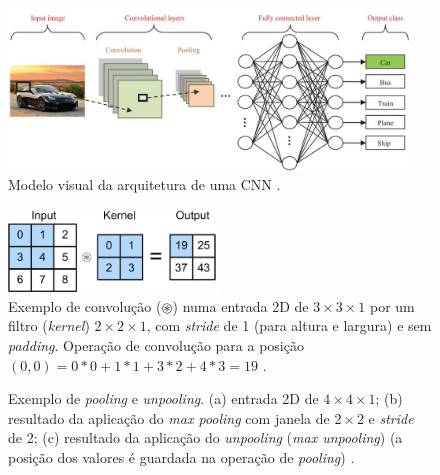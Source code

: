 \documentclass[12pt, a4paper, english, brazil]{article}
\begin{document}
\begin{figure}[htbp]
    \centering
    \includegraphics[width=0.95\textwidth]{img/cnn.jpg}
    \caption{Modelo visual da arquitetura de uma CNN \cite{Rawat_Wang_2017}.}
    \label{fig:cnn}
\end{figure}

\begin{figure}[htbp]
    \centering
    \includegraphics[width=0.5\textwidth]{img/conv.jpg}
    \caption{Exemplo de convolução ($\circledast$) numa entrada 2D de $3\times3\times1$ por um filtro (\textit{kernel}) $2\times2\times1$, com \textit{stride} de 1 (para altura e largura) e sem \textit{padding}. Operação de convolução para a posição $(0, 0) = 0 * 0 + 1 * 1 + 3 * 2 + 4 * 3 = 19$ \cite{Zhang_2021}.}
    \label{fig:conv}
\end{figure}

\begin{figure}[htbp]
    \centering
    \caption{Exemplo de \textit{pooling} e \textit{unpooling}. (a) entrada 2D de $4\times4\times1$; (b) resultado da aplicação do \textit{max pooling} com janela de $2\times2$ e \textit{stride} de 2; (c) resultado da aplicação do \textit{unpooling} (\textit{max unpooling}) (a posição dos valores é guardada na operação de \textit{pooling}) \cite{Fang_2017}.}
    \label{fig:pooling}
\end{figure}
\end{document}
